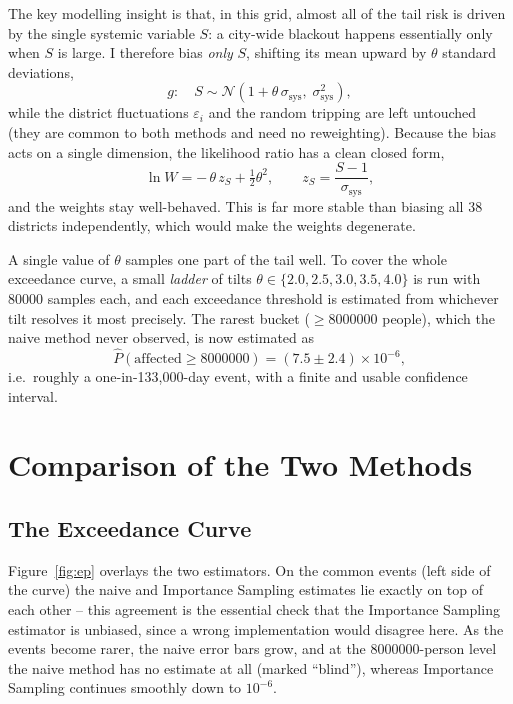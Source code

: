 \documentclass[11pt,a4paper]{article}
\begin{document}
The key modelling insight is that, in this grid, almost all of the tail risk is
driven by the single systemic variable $S$: a city-wide blackout happens
essentially only when $S$ is large. I therefore bias \emph{only} $S$, shifting
its mean upward by $\theta$ standard deviations,
\begin{equation}
    g:\quad S \sim \mathcal{N}\!\left(1 + \theta\,\sigma_{\text{sys}},\; \sigma_{\text{sys}}^2\right),
\end{equation}
while the district fluctuations $\varepsilon_i$ and the random tripping are left
untouched (they are common to both methods and need no reweighting). Because the
bias acts on a single dimension, the likelihood ratio has a clean closed form,
\begin{equation}
    \ln W = -\,\theta\, z_S + \tfrac{1}{2}\theta^2,
    \qquad z_S = \frac{S - 1}{\sigma_{\text{sys}}},
\end{equation}
and the weights stay well-behaved. This is far more stable than biasing all 38
districts independently, which would make the weights degenerate.

A single value of $\theta$ samples one part of the tail well. To cover the whole
exceedance curve, a small \emph{ladder} of tilts
$\theta \in \{2.0, 2.5, 3.0, 3.5, 4.0\}$ is run with \num{80000} samples each,
and each exceedance threshold is estimated from whichever tilt resolves it most
precisely. The rarest bucket ($\ge \num{8000000}$ people), which the naive method
never observed, is now estimated as
\begin{equation}
    \hat{P}(\text{affected} \ge \num{8000000}) = (7.5 \pm 2.4)\times 10^{-6},
\end{equation}
i.e.\ roughly a one-in-133{,}000-day event, with a finite and usable confidence
interval.

\section{Comparison of the Two Methods}

\subsection{The Exceedance Curve}

Figure~\ref{fig:ep} overlays the two estimators. On the common events (left side
of the curve) the naive and Importance Sampling estimates lie exactly on top of
each other -- this agreement is the essential check that the Importance Sampling
estimator is unbiased, since a wrong implementation would disagree here. As the
events become rarer, the naive error bars grow, and at the \num{8000000}-person
level the naive method has no estimate at all (marked ``blind''), whereas
Importance Sampling continues smoothly down to $10^{-6}$.
\end{document}
